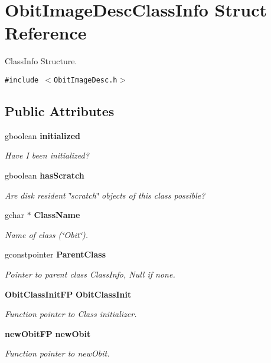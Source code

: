 \section{Obit\-Image\-Desc\-Class\-Info Struct Reference}
\label{structObitImageDescClassInfo}
Class\-Info Structure.  


{\tt \#include $<$Obit\-Image\-Desc.h$>$}

\subsection*{Public Attributes}
\begin{CompactItemize}
\item 
gboolean {\bf initialized}
\begin{CompactList}\small\item\em Have I been initialized? \item\end{CompactList}\item 
gboolean {\bf has\-Scratch}
\begin{CompactList}\small\item\em Are disk resident \char`\"{}scratch\char`\"{} objects of this class possible? \item\end{CompactList}\item 
gchar $\ast$ {\bf Class\-Name}
\begin{CompactList}\small\item\em Name of class (\char`\"{}Obit\char`\"{}). \item\end{CompactList}\item 
gconstpointer {\bf Parent\-Class}
\begin{CompactList}\small\item\em Pointer to parent class Class\-Info, Null if none. \item\end{CompactList}\item 
{\bf Obit\-Class\-Init\-FP} {\bf Obit\-Class\-Init}
\begin{CompactList}\small\item\em Function pointer to Class initializer. \item\end{CompactList}\item 
{\bf new\-Obit\-FP} {\bf new\-Obit}
\begin{CompactList}\small\item\em Function pointer to new\-Obit. \item\end{CompactList}\item 

\end{CompactItemize}
